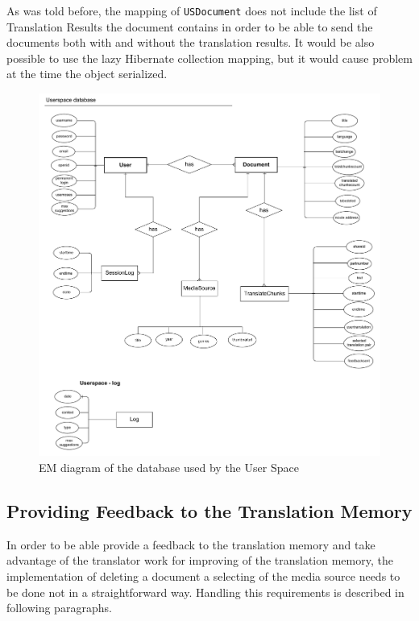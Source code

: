 As was told before, the mapping of {\tt USDocument} does not include the list of Translation Results the document contains in order to be able to send the documents both with and without the translation results. It would be also possible to use the lazy Hibernate collection mapping, but it would cause problem at the time the object serialized.

\begin{figure}
\begin{center}
\includegraphics[scale=0.5]{figures/userspacedb.pdf}
\end{center}
\caption{EM diagram of the database used by the User Space}
\label{fig:em_of_us}
\end{figure}

\subsection{Providing Feedback to the Translation Memory}

In order to be able provide a feedback to the translation memory and take advantage of the translator work for improving of the translation memory, the implementation of deleting a document a selecting of the media source needs to be done not in a straightforward way. Handling this requirements is described in following paragraphs.

